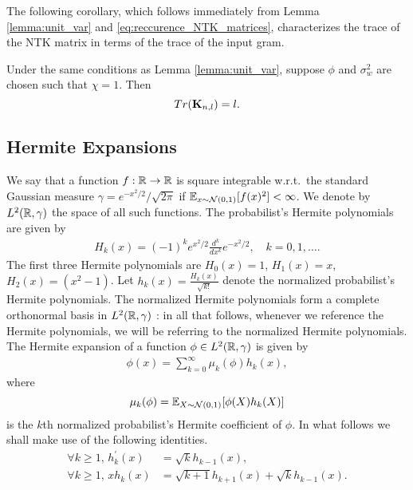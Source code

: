 The following corollary, which follows immediately from Lemma \ref{lemma:unit_var} and \eqref{eq:reccurence_NTK_matrices}, characterizes the trace of the NTK matrix in terms of the trace of the input gram.


\begin{corollary} \label{cor:trace_with_depth}
    Under the same conditions as Lemma \ref{lemma:unit_var}, suppose $\phi$ and $\sigma_w^2$ are chosen such that $\chi = 1$. Then 
    \begin{equation}
        Tr(\mathbf{K}_{n,l}) = l. 
    \end{equation}
\end{corollary}



\subsection{Hermite Expansions}\label{appendix:background_hermite}
We say that a function $f:\mathbb{R} \rightarrow \mathbb{R}$ is square integrable w.r.t.\ the standard Gaussian measure $\gamma = e^{-x^2/2} / \sqrt{2 \pi}$ if $\mathbb{E}_{x \sim \mathcal{N}(0,1)}[f(x)^2]< \infty$. 
We denote by $L^2(\mathbb{R},\gamma)$ the space of all such functions. The probabilist's Hermite polynomials are given by
\begin{align*}
	H_k(x)={(-1)}^ke^{x^2/2} \frac{d^{k}}{d x^{k}} e^{-x^2/2}, \quad k=0,1,\ldots .
\end{align*}
The first three Hermite polynomials are $H_0(x)=1$, $H_1(x)=x$, $H_2(x)=(x^2-1)$. 
Let $h_k(x)=\tfrac{H_k(x)}{\sqrt{k!}}$ denote the normalized probabilist's Hermite polynomials. The normalized Hermite polynomials form a complete orthonormal basis in $L^2(\mathbb{R},\gamma)$ \cite[\S 11]{donnellbook}: in all that follows, whenever we reference the Hermite polynomials, we will be referring to the normalized Hermite polynomials. The Hermite expansion of a function $\phi \in L^2(\mathbb{R} , \gamma)$ is given by 
\begin{align}\label{eq:HermiteExp}
	\phi(x)= \sum_{k=0}^\infty \mu_k(\phi) h_k(x),
\end{align}
where 
\begin{equation} \label{eq:norm_prob_hermite_coeffs}
    \mu_k(\phi) = \mathbb{E}_{X \sim \mathcal{N}(0,1)}[\phi(X)h_k(X)]
\end{equation}
is the $k$th normalized probabilist's Hermite coefficient of $\phi$. In what follows we shall make use of the following identities.
\begin{align}
\forall k \geq 1,\, h_{k}^{\prime}(x) &=\sqrt{k} h_{k-1}(x), \label{eq:HP1}\\
\forall k \geq 1,\, x h_{k}(x)&=\sqrt{k+1}h_{k+1}(x)+\sqrt{k} h_{k-1}(x). \label{eq:HP2}
\end{align}
